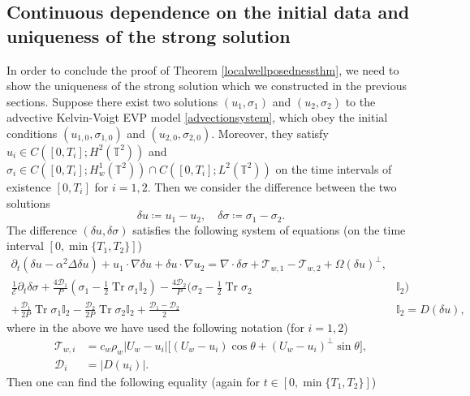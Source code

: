 \documentclass[12pt,a4paper]{article}
\theoremstyle{definition}
\theoremstyle{remark}
\numberwithin{equation}{section}
\DeclareMathOperator{\Tr}{Tr}
\begin{document}
\subsection{Continuous dependence on the initial data and uniqueness of the strong solution} \label{uniquenesssection}
In order to conclude the proof of Theorem \ref{localwellposednessthm}, we need to show the uniqueness of the strong solution which we constructed in the previous sections. Suppose there exist two solutions $(u_1, \sigma_1)$ and $(u_2, \sigma_2)$ to the advective Kelvin-Voigt EVP model \eqref{advectionsystem}, which obey the initial conditions $(u_{1,0}, \sigma_{1,0})$ and $(u_{2,0}, \sigma_{2,0})$. Moreover, they satisfy $u_i \in C([0,T_i];H^2 (\mathbb{T}^2))$ and $\sigma_i \in C([0,T_i]; H^1_w (\mathbb{T}^2)) \cap C([0,T_i]; L^2 (\mathbb{T}^2))$ on the time intervals of existence $[0,T_i]$ for $i=1,2$. Then we consider the difference between the two solutions
\begin{equation*}
\delta u \coloneqq u_1 - u_2, \quad \delta \sigma \coloneqq \sigma_1 - \sigma_2. 
\end{equation*}
The difference $(\delta u, \delta \sigma)$ satisfies the following system of equations (on the time interval $[0, \min \{ T_1, T_2 \}]$)
\begin{align}
\partial_t (\delta u - \alpha^2 \Delta \delta u) + u_1 \cdot \nabla \delta u + \delta u \cdot \nabla u_2  = \nabla \cdot \delta \sigma + \mathcal{T}_{w,1} - \mathcal{T}_{w,2} + \Omega (\delta u)^\perp ,  \\
\frac{1}{\mathcal{E}} \partial_t \delta \sigma + \frac{4 \mathcal D_1}{P}(\sigma_1 - \frac{1}{2} \Tr \sigma_1 \mathbb I_2) - \frac{4 \mathcal D_2}{P}(\sigma_2 - \frac{1}{2} \Tr \sigma_2 &\mathbb I_2 ) \nonumber \\
+ \frac{\mathcal D_1}{2P} \Tr \sigma_1 \mathbb I_2 - \frac{\mathcal D_2}{2P} \Tr \sigma_2 \mathbb I_2 
+ \frac{\mathcal{D}_1 - \mathcal{D}_2}{2} &\mathbb I_2 = D(\delta u),
\end{align}
where in the above we have used the following notation (for $i=1,2$)
\begin{align}
\mathcal{T}_{w,i} &= c_w \rho_w \lvert U_w - u_i \rvert \big[ (U_w - u_i) \cos \theta + (U_w - u_i)^\perp \sin \theta \big], \\
\mathcal{D}_i &= \lvert D(u_i) \rvert.
\end{align} 
Then one can find the following equality (again for $t \in [0, \min \{ T_1, T_2 \}]$)
\end{document}
